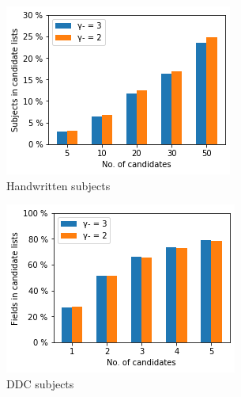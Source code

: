 \begin{figure}
  \begin{subfigure}[t]{.32\textwidth}
    \centering
    \includegraphics[width=\textwidth]{figures/supervised_approach/asl_neg_hw.png}
    \caption{Handwritten subjects}
    \label{fig:asl_neg_hw}
  \end{subfigure}
  \begin{subfigure}[t]{.32\textwidth}
    \centering
    \includegraphics[width=\textwidth]{figures/supervised_approach/asl_neg_ddc.png}
    \caption{DDC subjects}
    \label{fig:asl_neg_ddc}
  \end{subfigure}
   \begin{subfigure}[t]{.32\textwidth}
    \centering

\end{subfigure}
\end{figure}
